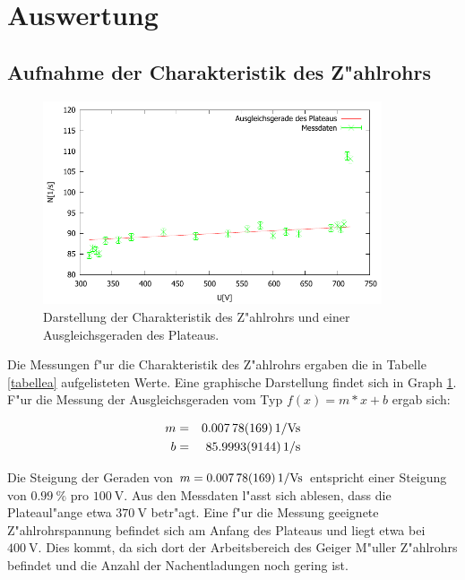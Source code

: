 \section{Auswertung}
	\label{sec:auswertung}

	\subsection{Aufnahme der Charakteristik des Z"ahlrohrs} %
	\label{sub:z_ahlrohr_charakteristik}

	

	\begin{figure}[!h]
		\centering	
		\includegraphics[width = 10cm]{img/charakteristik.pdf}
		\caption{Darstellung der Charakteristik des Z"ahlrohrs und einer Ausgleichsgeraden des Plateaus.}
		\label{charakteristik}
	\end{figure}

	Die Messungen f"ur die Charakteristik des Z"ahlrohrs ergaben die in Tabelle \ref{tabellea} aufgelisteten Werte. Eine graphische Darstellung findet sich in Graph \ref{charakteristik}.
	F"ur die Messung der Ausgleichsgeraden vom Typ $f(x) = m*x+b$ ergab sich:

	\begin{eqnarray*}
		m &=& \SI{0.00778 (169)}{1\per\volt\second}\\
		b &=& \SI{85.9993 (9144)}{1\per\second}
	\end{eqnarray*}

	Die Steigung der Geraden von $m = \SI{0.00778 (169)}{1\per\volt\second}$ entspricht einer Steigung von $\SI{0.99}{\%}$ pro $\SI{100}{\volt}$.
	Aus den Messdaten l"asst sich ablesen, dass die Plateaul"ange etwa $\SI{370}{\volt}$ betr"agt.
	Eine f"ur die Messung geeignete Z"ahlrohrspannung befindet sich am Anfang des Plateaus und liegt etwa bei $\SI{400}{\volt}$. Dies kommt, da sich dort der Arbeitsbereich des Geiger M"uller Z"ahlrohrs befindet und die Anzahl der Nachentladungen noch gering ist.

